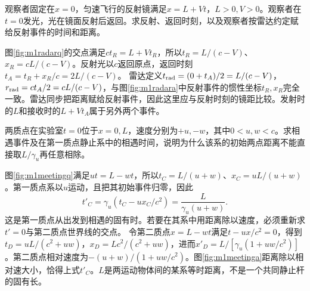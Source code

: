 \begin{example}\label{ex:m1radar}
观察者固定在$x=0$，匀速飞行的反射镜满足$x=L+Vt$，$L>0,V>0$。观察者在$t=0$发光，光在镜面反射后返回。求反射、返回时刻，以及观察者按雷达约定赋给反射事件的时间和距离。
\end{example}
\begin{solution}
图\ref{fig:m1radarq}的交点满足$ct_R=L+Vt_R$，所以$t_R=L/(c-V)$、$x_R=cL/(c-V)$。反射光以$c$返回原点，返回时刻$t_A=t_R+x_R/c=2L/(c-V)$。
雷达定义$t_{\rm rad}=(0+t_A)/2=L/(c-V)$，$r_{\rm rad}=ct_A/2=cL/(c-V)$，与图\ref{fig:m1radara}中反射事件的惯性坐标$t_R,x_R$完全一致。雷达同步把距离赋给反射事件，因此这里应与反射时刻的镜距比较。发射时的$L$和接收时的$L+Vt_A$属于另外两个事件。
\end{solution}

\begin{example}\label{ex:m1meeting}
两质点在实验室$t=0$位于$x=0,L$，速度分别为$+u,-w$，其中$0<u,w<c$。求相遇事件及在第一质点静止系中的相遇时间，说明为什么该系的初始两点距离不能直接取$L/\gamma_u$再任意相除。
\end{example}
\begin{solution}
图\ref{fig:m1meetingq}满足$ut=L-wt$，所以$t_C=L/(u+w)$、$x_C=uL/(u+w)$。第一质点系以$u$运动，且把其初始事件归零，因此
\[
 t'_C=\gamma_u(t_C-ux_C/c^2)=\frac{L}{\gamma_u(u+w)}.
\]
这是第一质点从出发到相遇的固有时。若要在其系中用距离除以速度，必须重新求$t'=0$与第二质点世界线的交点。
令第二质点$x=L-wt$满足$t-ux/c^2=0$，得到$t_D=uL/(c^2+uw)$，$x_D=Lc^2/(c^2+uw)$，进而$x'_D=L/[\gamma_u(1+uw/c^2)]$。第二质点相对速度为$-(u+w)/(1+uw/c^2)$。图\ref{fig:m1meetinga}距离除以相对速大小，恰得上式$t'_C$。$L$是两运动物体间的某系等时距离，不是一个共同静止杆的固有长。
\end{solution}

